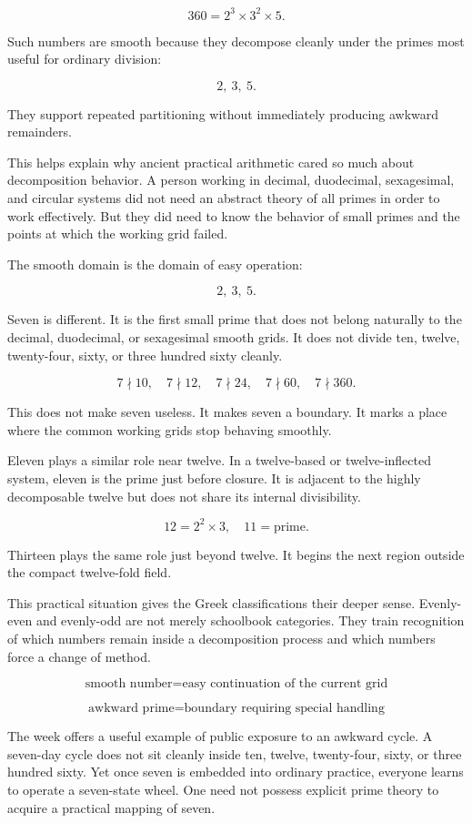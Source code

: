 \documentclass[11pt]{book}
\begin{document}
\[
360 = 2^3 \times 3^2 \times 5.
\]

Such numbers are smooth because they decompose cleanly under the primes most useful for ordinary division:

\[
2,\ 3,\ 5.
\]

They support repeated partitioning without immediately producing awkward remainders.

This helps explain why ancient practical arithmetic cared so much about decomposition behavior.  A person working in decimal, duodecimal, sexagesimal, and circular systems did not need an abstract theory of all primes in order to work effectively. But they did need to know the behavior of small primes and the points at which the working grid failed.

The smooth domain is the domain of easy operation:

\[
2,\ 3,\ 5.
\]

Seven is different. It is the first small prime that does not belong naturally to the decimal, duodecimal, or sexagesimal smooth grids. It does not divide ten, twelve, twenty-four, sixty, or three hundred sixty cleanly.

\[
7 \nmid 10,
\quad
7 \nmid 12,
\quad
7 \nmid 24,
\quad
7 \nmid 60,
\quad
7 \nmid 360.
\]

This does not make seven useless. It makes seven a boundary. It marks a place where the common working grids stop behaving smoothly.

Eleven plays a similar role near twelve. In a twelve-based or twelve-inflected system, eleven is the prime just before closure. It is adjacent to the highly decomposable twelve but does not share its internal divisibility.

\[
12 = 2^2 \times 3,
\quad
11 = \text{prime}.
\]

Thirteen plays the same role just beyond twelve. It begins the next region outside the compact twelve-fold field.

This practical situation gives the Greek classifications their deeper sense. Evenly-even and evenly-odd are not merely schoolbook categories. They train recognition of which numbers remain inside a decomposition process and which numbers force a change of method.

\[
\text{smooth number} = \text{easy continuation of the current grid}
\]

\[
\text{awkward prime} = \text{boundary requiring special handling}
\]

The week offers a useful example of public exposure to an awkward cycle. A seven-day cycle does not sit cleanly inside ten, twelve, twenty-four, sixty, or three hundred sixty. Yet once seven is embedded into ordinary practice, everyone learns to operate a seven-state wheel. One need not possess explicit prime theory to acquire a practical mapping of seven.
\end{document}
